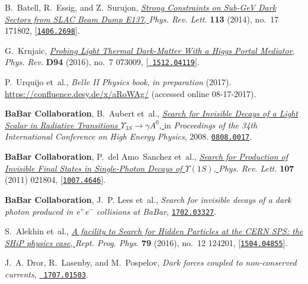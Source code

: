 \documentclass[11pt,a4paper]{article}
\begin{document}
\begin{thebibliography}{10}
B.~Batell, R.~Essig, and Z.~Surujon,
  \href{http://dx.doi.org/10.1103/PhysRevLett.113.171802}{{\it {Strong
  Constraints on Sub-GeV Dark Sectors from SLAC Beam Dump E137}}, } {\em Phys.
  Rev. Lett.} {\bf 113} (2014), no.~17 171802,
  [\href{http://arxiv.org/abs/1406.2698}{{\tt 1406.2698}}].

G.~Krnjaic, \href{http://dx.doi.org/10.1103/PhysRevD.94.073009}{{\it {Probing
  Light Thermal Dark-Matter With a Higgs Portal Mediator}}, } {\em Phys. Rev.}
  {\bf D94} (2016), no.~7 073009, [\href{http://arxiv.org/abs/1512.04119}{{\tt
  1512.04119}}].

P.~Urquijo et~al., {\it {Belle II Physics book}},  {\em in preparation} (2017).
  {\url{https://confluence.desy.de/x/aRoWAg/} (accessed online 08-17-2017).}

{\bf BaBar Collaboration}, B.~Aubert et~al.,
  \href{http://www-public.slac.stanford.edu/sciDoc/docMeta.aspx?slacPubNumber=slac-pub-13328}{{\it
  {Search for Invisible Decays of a Light Scalar in Radiative Transitions
  $\Upsilon_{3S} \to \gamma A^0$}}, } in {\em {Proceedings of the 34th
  International Conference on High Energy Physics}}, 2008.
\newblock \href{http://arxiv.org/abs/0808.0017}{{\tt 0808.0017}}.

{\bf BaBar Collaboration}, P.~del Amo~Sanchez et~al.,
  \href{http://dx.doi.org/10.1103/PhysRevLett.107.021804}{{\it {Search for
  Production of Invisible Final States in Single-Photon Decays of
  $\Upsilon(1S)$}}, } {\em Phys. Rev. Lett.} {\bf 107} (2011) 021804,
  [\href{http://arxiv.org/abs/1007.4646}{{\tt 1007.4646}}].

{\bf BaBar Collaboration}, J.~P. Lees et~al., {\it {Search for invisible decays
  of a dark photon produced in e$^+$e$^-$ collisions at BaBar}},
  \href{http://arxiv.org/abs/1702.03327}{{\tt 1702.03327}}.

S.~Alekhin et~al., \href{http://dx.doi.org/10.1088/0034-4885/79/12/124201}{{\it
  {A facility to Search for Hidden Particles at the CERN SPS: the SHiP physics
  case}}, } {\em Rept. Prog. Phys.} {\bf 79} (2016), no.~12 124201,
  [\href{http://arxiv.org/abs/1504.04855}{{\tt 1504.04855}}].

J.~A. Dror, R.~Lasenby, and M.~Pospelov, {\it {Dark forces coupled to
  non-conserved currents}},  \href{http://arxiv.org/abs/1707.01503}{{\tt
  1707.01503}}.


\end{thebibliography}
\end{document}
